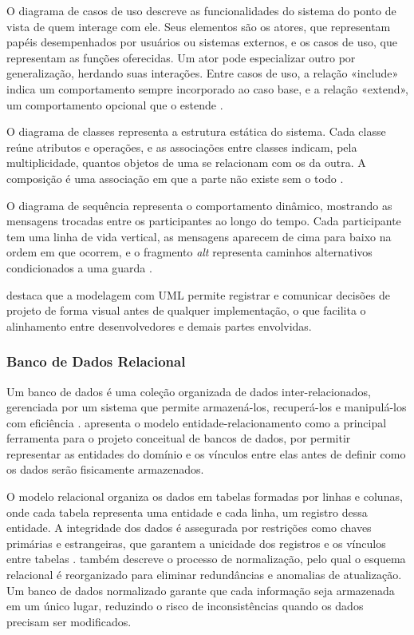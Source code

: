 \documentclass[
	12pt,				%
	twoside,			%
	openany,			%
	a4paper,			%
	chapter=TITLE,		%
	section=TITLE,		%
	subsection=TITLE,	%
	subsubsection=TITLE,%
	english,			%
	french,				%
	spanish,			%
	brazil,				%
	]{abntex2}
\begin{document}
O diagrama de casos de uso descreve as funcionalidades do sistema do ponto de vista de quem interage com ele. Seus elementos são os atores, que representam papéis desempenhados por usuários ou sistemas externos, e os casos de uso, que representam as funções oferecidas. Um ator pode especializar outro por generalização, herdando suas interações. Entre casos de uso, a relação «include» indica um comportamento sempre incorporado ao caso base, e a relação «extend», um comportamento opcional que o estende \cite{bezerra2007}.

O diagrama de classes representa a estrutura estática do sistema. Cada classe reúne atributos e operações, e as associações entre classes indicam, pela multiplicidade, quantos objetos de uma se relacionam com os da outra. A composição é uma associação em que a parte não existe sem o todo \cite{larman2007}.

O diagrama de sequência representa o comportamento dinâmico, mostrando as mensagens trocadas entre os participantes ao longo do tempo. Cada participante tem uma linha de vida vertical, as mensagens aparecem de cima para baixo na ordem em que ocorrem, e o fragmento \textit{alt} representa caminhos alternativos condicionados a uma guarda \cite{larman2007}.

 destaca que a modelagem com UML permite registrar e comunicar decisões de projeto de forma visual antes de qualquer implementação, o que facilita o alinhamento entre desenvolvedores e demais partes envolvidas.
\subsubsection{Banco de Dados Relacional}
\label{sec:bd}

Um banco de dados é uma coleção organizada de dados inter-relacionados, gerenciada por um sistema que permite armazená-los, recuperá-los e manipulá-los com eficiência \cite{heuser2009}.  apresenta o modelo entidade-relacionamento como a principal ferramenta para o projeto conceitual de bancos de dados, por permitir representar as entidades do domínio e os vínculos entre elas antes de definir como os dados serão fisicamente armazenados.

O modelo relacional organiza os dados em tabelas formadas por linhas e colunas, onde cada tabela representa uma entidade e cada linha, um registro dessa entidade. A integridade dos dados é assegurada por restrições como chaves primárias e estrangeiras, que garantem a unicidade dos registros e os vínculos entre tabelas \cite{silberschatz2012}.  também descreve o processo de normalização, pelo qual o esquema relacional é reorganizado para eliminar redundâncias e anomalias de atualização. Um banco de dados normalizado garante que cada informação seja armazenada em um único lugar, reduzindo o risco de inconsistências quando os dados precisam ser modificados.
\end{document}
